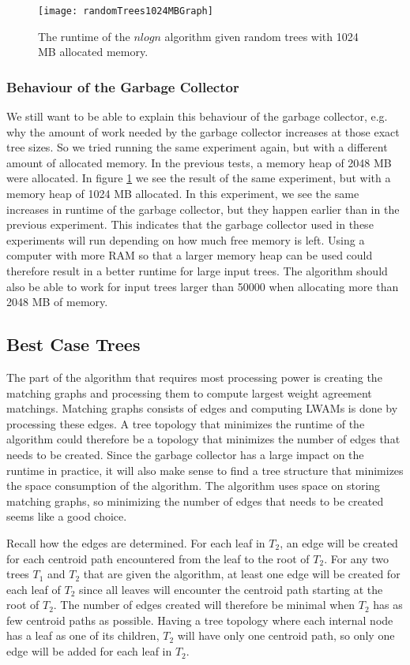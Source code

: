 \begin{figure}
	\texttt{[image: randomTrees1024MBGraph]}
	\caption{The runtime of the $nlogn$ algorithm given random trees with 1024 MB allocated memory.}
	\label{randomTrees1024MBGraph}
\end{figure}

\subsubsection{Behaviour of the Garbage Collector}
We still want to be able to explain this behaviour of the garbage collector, e.g. why the amount of work needed by the garbage collector increases at those exact tree sizes. So we tried running the same experiment again, but with a different amount of allocated memory. In the previous tests, a memory heap of 2048 MB were allocated. In figure \ref{randomTrees1024MBGraph} we see the result of the same experiment, but with a memory heap of 1024 MB allocated. In this experiment, we see the same increases in runtime of the garbage collector, but they happen earlier than in the previous experiment. This indicates that the garbage collector used in these experiments will run depending on how much free memory is left. Using a computer with more RAM so that a larger memory heap can be used could therefore result in a better runtime for large input trees. The algorithm should also be able to work for input trees larger than 50000 when allocating more than 2048 MB of memory.

\subsection{Best Case Trees}
The part of the algorithm that requires most processing power is creating the matching graphs and processing them to compute largest weight agreement matchings. Matching graphs consists of edges and computing LWAMs is done by processing these edges. A tree topology that minimizes the runtime of the algorithm could therefore be a topology that minimizes the number of edges that needs to be created. Since the garbage collector has a large impact on the runtime in practice, it will also make sense to find a tree structure that minimizes the space consumption of the algorithm. The algorithm uses space on storing matching graphs, so minimizing the number of edges that needs to be created seems like a good choice.

Recall how the edges are determined. For each leaf in $T_2$, an edge will be created for each centroid path encountered from the leaf to the root of $T_2$. For any two trees $T_1$ and $T_2$ that are given the algorithm, at least one edge will be created for each leaf of $T_2$ since all leaves will encounter the centroid path starting at the root of $T_2$. The number of edges created will therefore be minimal when $T_2$ has as few centroid paths as possible. Having a tree topology where each internal node has a leaf as one of its children, $T_2$ will have only one centroid path, so only one edge will be added for each leaf in $T_2$.

